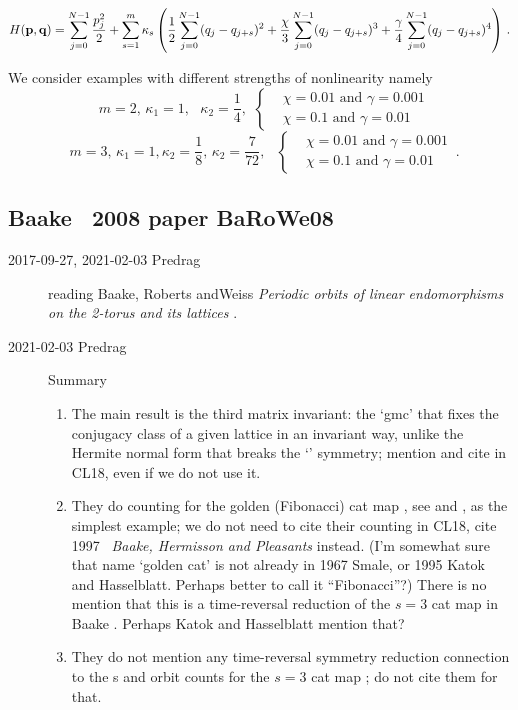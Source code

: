{\begin{equation}
\label{GKMM21:HN}
H({\bf{p}},{\bf{q}})=
\sum_{j=0}^{N-1}\frac{p_j^2}{2}+\sum_{s=1}^m\kappa_s\left(\frac{1}{2}\sum_{j=0}^{N-1}(q_j-q_{j+s})^2
+ \frac{\chi}{3}\sum_{j=0}^{N-1}(q_j-q_{j+s})^3 + \frac{\gamma }{4}\sum_{j=0}^{N-1}(q_j-q_{j+s})^4\right)
\,.
 \end{equation}

We consider examples
with different strengths of nonlinearity  namely
\[
\mbox{  $m=2, \, \kappa_1 = 1,$   $\kappa_2 = \frac{1}{4}$,}\;\;
\begin{cases}
	&\mbox{$\chi=0.01$ and $\gamma=0.001$}\\
	&\mbox{$\chi=0.1$ and $\gamma=0.01$ }
\end{cases}
\]
\[
\mbox{  $m=3, \, \kappa_1 = 1,$
$\kappa_2 = \frac{1}{8}$, $\kappa_2 = \frac{7}{72}$, }\;\;
\begin{cases}
	&\mbox{$\chi=0.01$ and $\gamma=0.001$}\\
	&\mbox{$\chi=0.1$ and $\gamma=0.01$ }
\end{cases}\, .
\]


\subsection{Baake \etal\ 2008 paper {BaRoWe08}}
\label{sect:BaRoWe08}

\begin{description}

 \item[2017-09-27, 2021-02-03 Predrag] reading
 Baake, Roberts andWeiss
{\em Periodic orbits of linear endomorphisms on the 2-torus and its lattices}
.
 \item[2021-02-03 Predrag] Summary
 \begin{enumerate}
   \item
The main result is the third matrix invariant: the `gmc' that fixes the
conjugacy class of a given lattice in an invariant way, unlike the
Hermite normal form  that breaks the `\spt'
symmetry; mention and cite in CL18, even if we do not use it.
   \item
They do counting for the golden (Fibonacci) cat map , see
 and , as the simplest example;
we do not need to cite their counting in CL18, cite  1997
~{\em Baake,
Hermisson and Pleasants} instead. (I'm somewhat sure that
name `golden cat'
is not already in 1967 Smale, or 1995 Katok and
Hasselblatt. Perhaps better to call it ``Fibonacci''?)
    There is no mention that this is a time-reversal reduction of
    the $s=3$ cat map in  Baake \etal{}. Perhaps
    Katok and Hasselblatt mention that?
   \item
They do not mention any time-reversal symmetry reduction connection to the
{\lattstate}s and %
orbit counts for the ${s}=3$ cat map
; do not cite them for that.
 \end{enumerate}


\end{description}}
